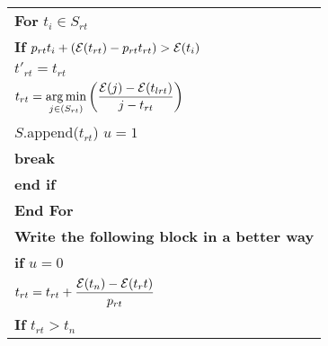 \begin{table}
\begin{minipage}[b]{8cm}
\begin{tabular}{p{7cm}}
\\
\hspace{4mm}\textbf{For} $t_i \in S_{rt}$
\\
\hspace{7mm}\textbf{If} $p_{rt}t_i + (\mathcal{E}(t_{rt}) - p_{rt}t_{rt}) > \mathcal{E}(t_i)$
\\
\hspace{10mm}$t'_{rt} = t_{rt}$
\\
\hspace{10mm}$t_{rt} = \displaystyle \operatorname*{arg\,min}_{j\in(S_{rt})}\left(\dfrac{\mathcal{E}(j)-\mathcal{E}(t_{lrt})}{j-t_{rt}}\right)$
\\
\hspace{10mm}$S$.append($t_{rt}$)
\hspace{10mm}$u=1$
\\
\hspace{10mm}\textbf{break}
\\
\hspace{7mm}\textbf{end if}
\\
\hspace{4mm}\textbf{End For}
\\
\textbf{Write the following block in a better way}\\
\hspace{4mm}\textbf{if} $u=0$
\\
\hspace{7mm} $t_{rt} = t_{rt} + \dfrac{\mathcal{E}(t_n)-\mathcal{E}(t_rt)}{p_{rt}}$
\\
\hspace{7mm}\textbf{If} $t_{rt}>t_{n}$
\\

\end{tabular}
\end{minipage}
\end{table}
